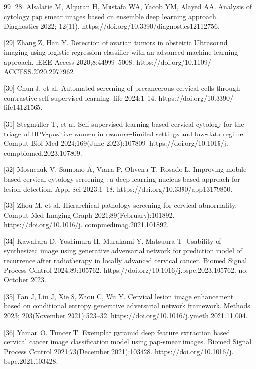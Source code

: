 \documentclass[final,5p,times,twocolumn,authoryear]{elsarticle}
\begin{document}
\begin{thebibliography}{99}
 [28] Alsalatie M, Alquran H, Mustafa WA, Yacob YM, Alayed AA. Analysis of cytology pap smear images based on ensemble deep learning approach. Diagnostics 2022; 12(11). https://doi.org/10.3390/diagnostics12112756.

 [29] Zhang Z, Han Y. Detection of ovarian tumors in obstetric Ultrasound imaging using logistic regression classifier with an advanced machine learning approach. IEEE Access 2020;8:44999–5008. https://doi.org/10.1109/ ACCESS.2020.2977962.

 [30] Chun J, et al. Automated screening of precancerous cervical cells through contrastive self-supervised learning. life 2024:1–14. https://doi.org/10.3390/ life14121565.

 [31] Stegmüller T, et al. Self-supervised learning-based cervical cytology for the triage of HPV-positive women in resource-limited settings and low-data regime. Comput Biol Med 2024;169(June 2023):107809. https://doi.org/10.1016/j. compbiomed.2023.107809.

 [32] Mosiichuk V, Sampaio A, Viana P, Oliveira T, Rosado L. Improving mobile-based cervical cytology screening : a deep learning nucleus-based approach for lesion detection. Appl Sci 2023:1–18. https://doi.org/10.3390/app13179850.

 [33] Zhou M, et al. Hierarchical pathology screening for cervical abnormality. Comput Med Imaging Graph 2021;89(February):101892. https://doi.org/10.1016/j. compmedimag.2021.101892.

 [34] Kawahara D, Yoshimura H, Murakami Y, Matsuura T. Usability of synthesized image using generative adversarial network for prediction model of recurrence after radiotherapy in locally advanced cervical cancer. Biomed Signal Process Control 2024;89:105762. https://doi.org/10.1016/j.bspc.2023.105762. no. October 2023.

 [35] Fan J, Liu J, Xie S, Zhou C, Wu Y. Cervical lesion image enhancement based on conditional entropy generative adversarial network framework. Methods 2023; 203(November 2021):523–32. https://doi.org/10.1016/j.ymeth.2021.11.004.

 [36] Yaman O, Tuncer T. Exemplar pyramid deep feature extraction based cervical cancer image classification model using pap-smear images. Biomed Signal Process Control 2021;73(December 2021):103428. https://doi.org/10.1016/j. bspc.2021.103428.


\end{thebibliography}
\end{document}
